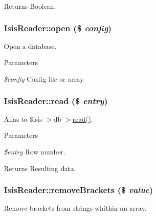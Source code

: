 \begin{DoxyReturn}{Returns}
Boolean. 
\end{DoxyReturn}
\hypertarget{classIsisReader_afa6e3d3d94854913e5ed2604919d2316}{
\subsubsection[{open}]{\setlength{\rightskip}{0pt plus 5cm}IsisReader::open (\$ {\em config})}}
\label{classIsisReader_afa6e3d3d94854913e5ed2604919d2316}
Open a database.


\begin{DoxyParams}{Parameters}
\item[{\em \$config}]Config file or array. \end{DoxyParams}
\hypertarget{classIsisReader_a630791a319bec2bc55d0102cbb7f93df}{
\subsubsection[{read}]{\setlength{\rightskip}{0pt plus 5cm}IsisReader::read (\$ {\em entry})}}
\label{classIsisReader_a630791a319bec2bc55d0102cbb7f93df}
Alias to \$isis-\/$>$db-\/$>$\hyperlink{classIsisReader_a630791a319bec2bc55d0102cbb7f93df}{read()}.


\begin{DoxyParams}{Parameters}
\item[{\em \$entry}]Row number.\end{DoxyParams}
\begin{DoxyReturn}{Returns}
Resulting data. 
\end{DoxyReturn}
\hypertarget{classIsisReader_a99ce7b10b2997dad6a64558ac1f9f10e}{
\subsubsection[{removeBrackets}]{\setlength{\rightskip}{0pt plus 5cm}IsisReader::removeBrackets (\$ {\em value})}}
\label{classIsisReader_a99ce7b10b2997dad6a64558ac1f9f10e}
Remove brackets from strings whithin an array.


